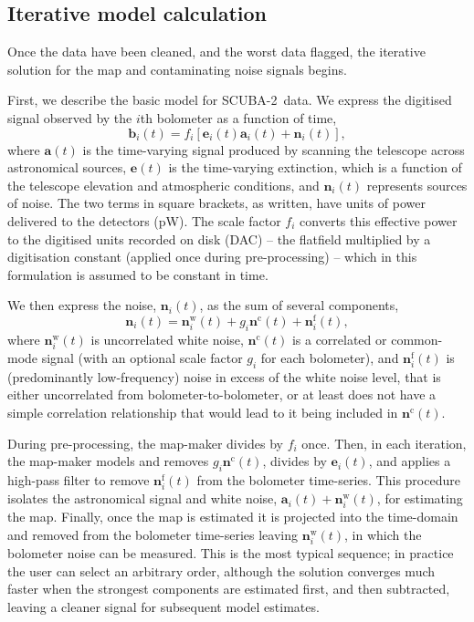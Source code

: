 \documentclass[useAMS,usenatbib,nofootinbib]{mn2e}
\newcommand{\scuba}{SCUBA-2}
\begin{document}
\subsection{Iterative model calculation}
\label{sec:components}

Once the data have been cleaned, and the worst data flagged, the
iterative solution for the map and contaminating noise signals begins.

First, we describe the basic model for \scuba\ data. We express the
digitised signal observed by the $i$th bolometer as a function of
time,
%
\begin{equation}
\mathbf{b}_i(t) = f_i[\mathbf{e}_i(t) \mathbf{a}_i(t) + \mathbf{n}_i(t)],
\label{eq:model}
\end{equation}
%
where $\mathbf{a}(t)$ is the time-varying signal produced by scanning
the telescope across astronomical sources, $\mathbf{e}(t)$ is the
time-varying extinction, which is a function of the telescope
elevation and atmospheric conditions, and $\mathbf{n}_i(t)$ represents
sources of noise. The two terms in square brackets, as written, have
units of power delivered to the detectors (pW). The scale factor $f_i$
converts this effective power to the digitised units recorded on disk
(DAC) -- the flatfield multiplied by a digitisation constant (applied
once during pre-processing) -- which in this formulation is assumed to
be constant in time.

We then express the noise, $\mathbf{n}_i(t)$, as the sum of several
components,
%
\begin{equation}
  \mathbf{n}_i(t) = \mathbf{n}^\mathrm{w}_i(t) +
  g_i\mathbf{n}^\mathrm{c}(t) + \mathbf{n}^\mathrm{f}_i(t),
\label{eq:noise}
\end{equation}
%
where $\mathbf{n}^\mathrm{w}_i(t)$ is uncorrelated white noise,
$\mathbf{n}^\mathrm{c}(t)$ is a correlated or common-mode signal (with
an optional scale factor $g_i$ for each bolometer), and
$\mathbf{n}^\mathrm{f}_i(t)$ is (predominantly low-frequency) noise in
excess of the white noise level, that is either uncorrelated from
bolometer-to-bolometer, or at least does not have a simple correlation
relationship that would lead to it being included in
$\mathbf{n}^\mathrm{c}(t)$.

During pre-processing, the map-maker divides by $f_i$ once. Then, in
each iteration, the map-maker models and removes
$g_i\mathbf{n}^\mathrm{c}(t)$, divides by $\mathbf{e}_i(t)$, and
applies a high-pass filter to remove $\mathbf{n}^\mathrm{f}_i(t)$ from
the bolometer time-series. This procedure isolates the astronomical
signal and white noise, $\mathbf{a}_i(t) +
\mathbf{n}^\mathrm{w}_i(t)$, for estimating the map. Finally, once the
map is estimated it is projected into the time-domain and removed from
the bolometer time-series leaving $\mathbf{n}^\mathrm{w}_i(t)$, in
which the bolometer noise can be measured. This is the most typical
sequence; in practice the user can select an arbitrary order, although
the solution converges much faster when the strongest components are
estimated first, and then subtracted, leaving a cleaner signal for
subsequent model estimates.
\end{document}
